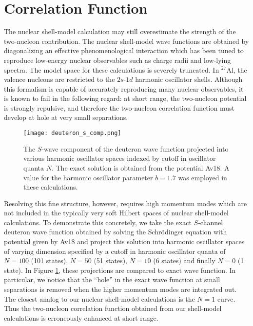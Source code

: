 \documentclass{book}[letterpaper,12pt]
\begin{document}
\section{Correlation Function}
\label{sec:cor_fun}
The nuclear shell-model calculation may still overestimate the strength of the two-nucleon contribution. The nuclear shell-model wave functions are obtained by diagonalizing an effective phenomenological interaction which has been tuned to reproduce low-energy nuclear observables such as charge radii and low-lying spectra. The model space for these calculations is severely truncated. In $^{27}$Al, the valence nucleons are restricted to the $2s$-$1d$ harmonic oscillator shells. Although this formalism is capable of accurately reproducing many nuclear observables, it is known to fail in the following regard: at short range, the two-nucleon potential is strongly repulsive, and therefore the two-nucleon correlation function must develop at hole at very small separations.

\begin{figure}
\centering
\texttt{[image: deuteron\_s\_comp.png]}
\caption{The $S$-wave component of the deuteron wave function projected into various harmonic oscillator spaces indexed by cutoff in oscillator quanta $N$. The exact solution is obtained from the potential Av18. A value for the harmonic oscillator parameter $b=1.7$ was employed in these calculations.}
\label{fig:deuteron_proj}
\end{figure}

Resolving this fine structure, however, requires high momentum modes which are not included in the typically very soft Hilbert spaces of nuclear shell-model calculations. To demonstrate this concretely, we take the exact $S$-channel deuteron wave function obtained by solving the Schr\"odinger equation with potential given by Av18\cite{PhysRevC.51.38} and project this solution into harmonic oscillator spaces of varying dimension specified by a cutoff in harmonic oscillator quanta of $N=100$ (101 states), $N=50$ (51 states), $N=10$ (6 states) and finally $N=0$ (1 state). In Figure \ref{fig:deuteron_proj}, these projections are compared to exact wave function. In particular, we notice that the ``hole'' in the exact wave function at small separations is removed when the higher momentum modes are integrated out. The closest analog to our nuclear shell-model calculations is the $N=1$ curve. Thus the two-nucleon correlation function obtained from our shell-model calculations is erroneously enhanced at short range.
\end{document}
